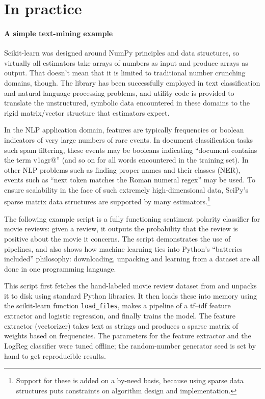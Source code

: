 \documentclass[a4paper]{article}
\begin{document}
\section{In practice}

\paragraph{A simple text-mining example}
%
Scikit-learn was designed around NumPy principles and data structures,
so virtually all estimators take arrays of numbers as input
and produce arrays as output.
That doesn't mean that it is limited to traditional number crunching domains,
though.
The library has been successfully employed in text classification
and natural language processing problems,
and utility code is provided to translate the unstructured, symbolic data
encountered in these domains
to the rigid matrix/vector structure that estimators expect.

In the NLP application domain,
features are typically frequencies or boolean indicators
of very large numbers of rare events.
In document classification tasks such spam filtering,
these events may be booleans indicating
``document contains the term \textsf{v1agr@}''
(and so on for all words encountered in the training set).
In other NLP problems such as finding proper names and their classes (NER),
events such as ``next token matches the Roman numeral regex'' may be used.
To ensure scalability in the face of such extremely high-dimensional data,
SciPy's sparse matrix data structures are supported by many estimators.\footnote{
  Support for these is added on a by-need basis,
  because using sparse data structures puts constraints on algorithm design
  and implementation.
}

The following example script is a fully functioning
sentiment polarity classifier for movie reviews:
given a review, it outputs the probability that the review is positive
about the movie it concerns.
The script demonstrates the use of pipelines,
and also shows how machine learning ties into Python's
``batteries included'' philosophy:
downloading, unpacking and learning from a dataset
are all done in one programming language.


This script first fetches the hand-labeled movie review dataset from
\cite{pang2004} and unpacks it to disk using standard Python libraries.
It then loads these into memory using the scikit-learn function
\texttt{load\_files}, makes a pipeline of a \textsf{tf--idf} feature extractor
\cite{rennie2003tackling} and logistic regression,
and finally trains the model.
The feature extractor (vectorizer) takes text as strings
and produces a sparse matrix of weights based on frequencies.
The parameters for the feature extractor and the LogReg classifier
were tuned offline; the random-number generator seed is set by hand
to get reproducible results.
\end{document}
